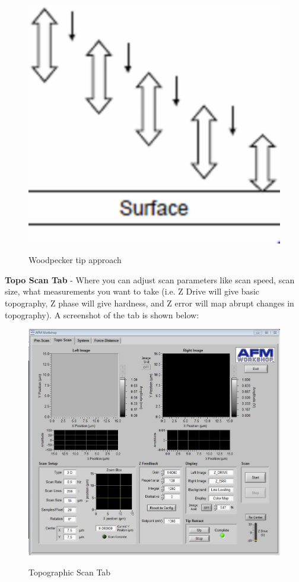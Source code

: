 \documentclass{../lab}
\begin{document}
\begin{itemize}
    \begin{figure}[h]
        \centering
        \href{http://experimentationlab.berkeley.edu/sites/default/files/AFMImages/AFMwoodpecker.png}{\includegraphics[width=0.4\linewidth]{images/AFMwoodpecker.png}}
        \caption{Woodpecker tip approach}
        \label{Woodpecker}
    \end{figure}

\end{itemize}

\textbf{Topo Scan Tab} - Where you can adjust scan parameters like scan speed, scan size, what measurements you want to take (i.e. Z Drive will give basic topography, Z phase will give hardness, and Z error will map abrupt changes in topography). A screenshot of the tab is shown below:

\begin{figure}[h]
\centering
    \href{http://experimentationlab.berkeley.edu/sites/default/files/AFMImages/toposcan.JPG}{\includegraphics[width=0.48\linewidth]{images/toposcan.JPG}}
    \caption{Topographic Scan Tab}
\end{figure}
\end{document}
